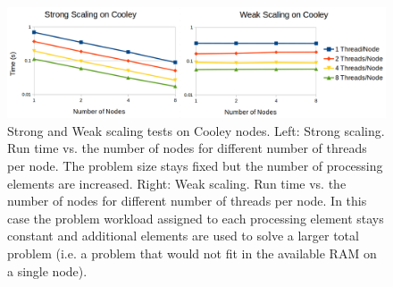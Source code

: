 \documentclass[10pt,letterpaper]{article}
\begin{document}
\begin{figure}[h!]
    \centering
    \includegraphics[width=1.0\textwidth]{Strong_Weak.png}
    \caption{Strong and Weak scaling tests on Cooley nodes. Left: Strong scaling. Run time vs. the number of nodes for different number of threads per node.
	    The problem size stays fixed but the number of processing elements are increased.
    Right: Weak scaling. Run time vs. the number of nodes for different number of threads per node.
    In this case the problem workload assigned to each processing element stays constant and additional elements are used to solve a larger total problem (i.e. a problem that would not fit in the available RAM on a single node).}
    \label{fig:Strong_Weak}
\end{figure}

\pagebreak







\end{document}
